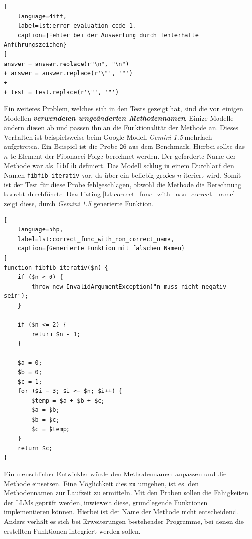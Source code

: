\begin{lstlisting}[
	language=diff,
	label=lst:error_evaluation_code_1,
	caption={Fehler bei der Auswertung durch fehlerhafte Anführungszeichen}
]
answer = answer.replace(r"\n", "\n")
+ answer = answer.replace(r'\"', '"')
+ 
+ test = test.replace(r'\"', '"') 
\end{lstlisting}

Ein weiteres Problem, welches sich in den Tests gezeigt hat, sind die von einigen Modellen \textit{\textbf{verwendeten umgeänderten Methodennamen}}. Einige Modelle ändern diesen ab und passen ihn an die Funktionalität der Methode an. Dieses Verhalten ist beispielsweise beim Google Modell \textit{Gemini 1.5} mehrfach aufgetreten. Ein Beispiel ist die Probe 26 aus dem Benchmark. Hierbei sollte das $n$-te Element der Fibonacci-Folge berechnet werden. Der geforderte Name der Methode war als \texttt{fibfib} definiert. Das Modell schlug in einem Durchlauf den Namen \texttt{fibfib\_iterativ} vor, da über ein beliebig großes $n$ iteriert wird. Somit ist der Test für diese Probe fehlgeschlagen, obwohl die Methode die Berechnung korrekt durchführte. Das Listing \ref{lst:correct_func_with_non_correct_name} zeigt diese, durch \textit{Gemini 1.5} generierte Funktion.\vspace{0.2cm}

\begin{lstlisting}[
	language=php,
	label=lst:correct_func_with_non_correct_name,
	caption={Generierte Funktion mit falschen Namen}
]
function fibfib_iterativ($n) {
    if ($n < 0) {
        throw new InvalidArgumentException("n muss nicht-negativ sein");
    }

    if ($n <= 2) {
        return $n - 1;
    }

    $a = 0;
    $b = 0;
    $c = 1;
    for ($i = 3; $i <= $n; $i++) {
        $temp = $a + $b + $c;
        $a = $b;
        $b = $c;
        $c = $temp;
    }
    return $c;
}
\end{lstlisting}

Ein menschlicher Entwickler würde den Methodennamen anpassen und die Methode einsetzen. Eine Möglichkeit dies zu umgehen, ist es, den Methodennamen zur Laufzeit zu ermitteln. Mit den Proben sollen die Fähigkeiten der LLMs geprüft werden, inwieweit diese, grundlegende Funktionen implementieren können. Hierbei ist der Name der Methode nicht entscheidend. Anders verhält es sich bei Erweiterungen bestehender Programme, bei denen die erstellten Funktionen integriert werden sollen.\vspace{0.2cm}


